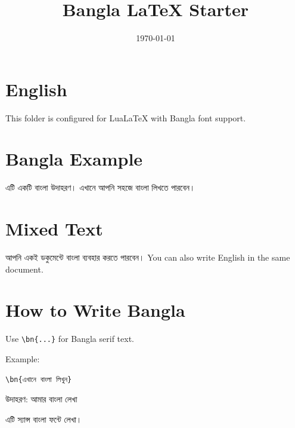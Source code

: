 \documentclass[12pt]{article}
\title{Bangla LaTeX Starter}
\author{}
\date{\today}
\newcommand{\bn}[1]{{\normalfont\banglafont #1}}
\newcommand{\bnsf}[1]{{\normalfont\banglasans #1}}
\begin{document}
\maketitle

\section*{English}
This folder is configured for LuaLaTeX with Bangla font support.

\section*{Bangla Example}
\bn{এটি একটি বাংলা উদাহরণ। এখানে আপনি সহজে বাংলা লিখতে পারবেন।}

\section*{Mixed Text}
\bn{আপনি একই ডকুমেন্টে বাংলা ব্যবহার করতে পারবেন।}
You can also write English in the same document.

\section*{How to Write Bangla}
Use \texttt{\textbackslash bn\{...\}} for Bangla serif text.

Example:

\begin{verbatim}
\bn{এখানে বাংলা লিখুন}
\end{verbatim}

\bn{উদাহরণ: আমার বাংলা লেখা}

\bnsf{এটি স্যান্স বাংলা ফন্টে লেখা।}
\end{document}
